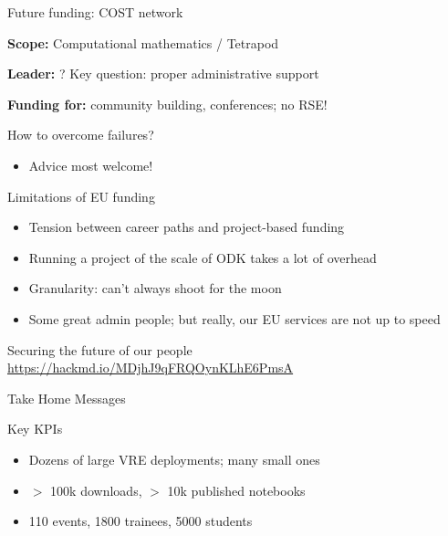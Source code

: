 \documentclass[svgnames]{beamer}
\begin{document}
\begin{frame}{Future funding: COST network}

  \textbf{Scope:} Computational mathematics / Tetrapod
  \pause

  \textbf{Leader:} ? Key question: proper administrative support
  \bigskip

  \textbf{Funding for:} community building, conferences; no RSE!
\end{frame}

\begin{frame}
  \begin{block}{How to overcome failures?}\pause
    \begin{itemize}
    \item Advice most welcome!\pause
    \end{itemize}
  \end{block}
  \bigskip

  \begin{block}{Limitations of EU funding}
    \begin{itemize}
    \item Tension between career paths and project-based funding
      \bigskip\pause
    \item Running a project of the scale of ODK takes a lot of overhead
    \item Granularity: can't always shoot for the moon
      \bigskip\pause
    \item Some great admin people; but really, our EU services are not up to speed
    \end{itemize}
  \end{block}
\end{frame}

\begin{frame}{Securing the future of our people}
  \url{https://hackmd.io/MDjhJ9qFRQOynKLhE6PmsA}
\end{frame}

\begin{frame}{Take Home Messages}
  \begin{block}{Key KPIs}
    \begin{itemize}
    \item Dozens of large VRE deployments; many small ones
    \item $>$ 100k downloads, $>$ 10k published notebooks
    \item 110 events, 1800 trainees, 5000 students
    \end{itemize}
  \end{block}
\end{frame}
\end{document}
